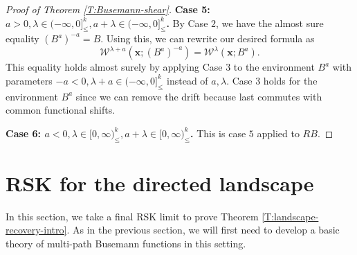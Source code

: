 \documentclass[11pt]{article}
\newcommand{\Z}{\mathbb{Z}}
\newcommand{\N}{\mathbb{N}}
\newcommand{\R}{\mathbb{R}}
\newcommand{\la}{\lambda}
\newcommand{\cB}{\mathcal{B}}
\newcommand{\cC}{\mathcal{C}}
\newcommand{\cW}{\mathcal{W}}
\newcommand{\bx}{\mathbf{x}}
\theoremstyle{definition} %
\newtheorem{remark}[theorem]{Remark}
\theoremstyle{remark} %
\begin{document}
\begin{proof}[Proof of Theorem \ref{T:Busemann-shear}]
\textbf{Case 5: $a > 0, \la \in (-\infty, 0]^k_\le, a + \la \in (-\infty, 0]^k_\le$.} By Case $2$, we have the almost sure equality $(B^a)^{-a} = B$. Using this, we can rewrite our desired formula as
$$
\cW^{\la + a}(\bx; (B^a)^{-a}) = \cW^{\la}(\bx; B^a).
$$ 
This equality holds almost surely by applying Case $3$ to the environment $B^a$ with parameters $-a < 0, \la + a \in (-\infty, 0]^k_\le$ instead of $a, \la$. Case $3$ holds for the environment $B^a$ since we can remove the drift because last commutes with common functional shifts.

\textbf{Case 6: $a < 0, \la \in [0, \infty)^k_\le, a + \la \in [0, \infty)^k_\le$.} \qquad This is case $5$ applied to $RB$.
\end{proof}




\section{RSK for the directed landscape}
\label{S:reconstruction}

In this section, we take a final RSK limit to prove Theorem \ref{T:landscape-recovery-intro}. As in the previous section, we will first need to develop a basic theory of multi-path Busemann functions in this setting.
\end{document}
